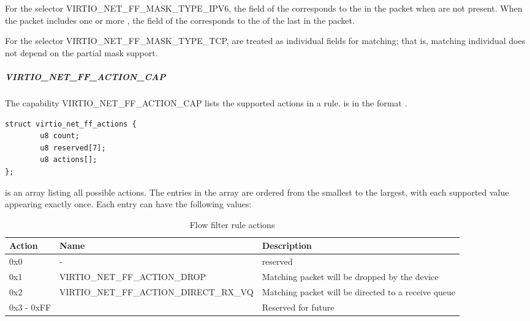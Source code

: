 For the selector  VIRTIO_NET_FF_MASK_TYPE_IPV6, the  field
of the  corresponds to the  in the packet
when  are not present. When the packet includes
one or more , the  field of
the  corresponds to the  of the last
 in the packet.

For the selector  VIRTIO_NET_FF_MASK_TYPE_TCP, 
are treated as individual fields for matching; that is, matching individual
 does not depend on the partial mask support.

\subparagraph{VIRTIO_NET_FF_ACTION_CAP}
\label{par:Device Types / Network Device / Device Operation / Flow filter / Device and driver capabilities / VIRTIO-NET-FF-ACTION-CAP}

The capability VIRTIO_NET_FF_ACTION_CAP lists the supported actions in a rule.
 is in the format .

\begin{lstlisting}
struct virtio_net_ff_actions {
        u8 count;
        u8 reserved[7];
        u8 actions[];
};
\end{lstlisting}

 is an array listing all possible actions.
The entries in the array are ordered from the smallest to the largest,
with each supported value appearing exactly once. Each entry can have the
following values:

\begin{table}[H]
\caption{Flow filter rule actions}
\label{table:Device Types / Network Device / Device Operation / Flow filter / Device and driver capabilities / VIRTIO-NET-FF-ACTION-CAP / flow filter rule actions}
\begin{tabularx}{\textwidth}{ |l|X|X| }
\hline
Action & Name & Description \\
\hline \hline
0x0 & - & reserved \\
\hline
0x1 & VIRTIO_NET_FF_ACTION_DROP & Matching packet will be dropped by the device \\
\hline
0x2 & VIRTIO_NET_FF_ACTION_DIRECT_RX_VQ & Matching packet will be directed to a receive queue \\
\hline
0x3 - 0xFF & & Reserved for future \\
\hline
\end{tabularx}
\end{table}

